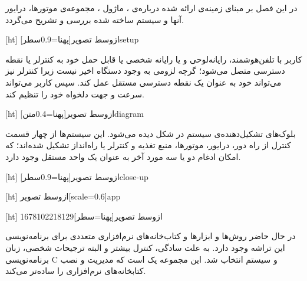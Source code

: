 
در این فصل بر مبنای زمینه‌ی ارائه شده درباره‌ی ، ماژول ، مجموعه‌ی موتورها، درایور آنها و سیستم ساخته شده بررسی و تشریح می‌گردد.

[ht]
‌ازوسط
‌تصویر[پهنا=0.9‌سطر]{setup}


کاربر با تلفن‌هوشمند، رایانه‌لوحی و یا رایانه شخصی یا قابل حمل خود به کنترلر یا نقطه دسترسی  متصل می‌شود؛ گرچه لزومی به وجود دستگاه اخیر نیست زیرا کنترلر نیز می‌تواند خود به عنوان یک نقطه دسترسی مستقل عمل کند. سپس کاربر می‌تواند سرعت و جهت دلخواه خود را تنظیم کند.

[ht]
‌ازوسط
‌تصویر[پهنا=0.4‌متن]{diagram}

بلوک‌های تشکیل‌دهنده‌ی سیستم در شکل  دیده می‌شود. این سیستم‌ها از چهار قسمت کنترل از راه دور، درایور، موتورها، منبع تغذیه و کنترلر یا راه‌انداز تشکیل شده‌اند؛ که امکان ادغام دو یا سه مورد آخر به عنوان یک واحد مستقل وجود دارد.

[ht]
‌ازوسط
‌تصویر[پهنا=0.9‌سطر]{close-up}

[ht]
‌ازوسط
‌تصویر[scale=0.6]{app}


[ht]
‌ازوسط
‌تصویر[پهنا=‌سطر]{1678102218129}



در حال حاضر روش‌ها و ابزارها و کتاب‌خانه‌های نرم‌افزاری متعددی برای برنامه‌نویسی این تراشه وجود دارد. به علت سادگی، کنترل بیشتر و البته ترجیحات شخصی، زبان برنامه‌نویسی C و سیستم  انتخاب شد. این مجموعه یک  است که مدیریت و نصب کتابخانه‌های نرم‌افزاری را ساده‌تر می‌کند.


